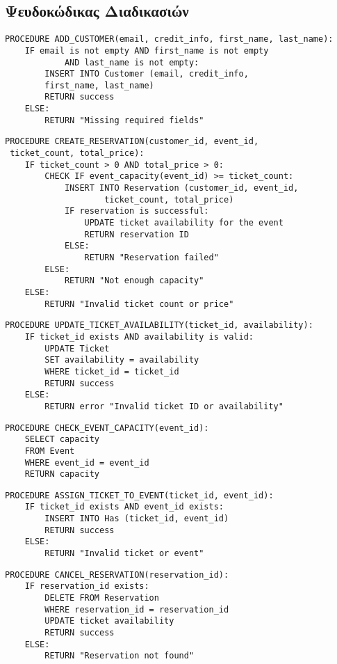\documentclass[a4paper, 11pt]{article}
\begin{document}
\subsection*{Ψευδοκώδικας Διαδικασιών}
\begin{verbatim}
PROCEDURE ADD_CUSTOMER(email, credit_info, first_name, last_name):
    IF email is not empty AND first_name is not empty 
    		AND last_name is not empty:
        INSERT INTO Customer (email, credit_info, 
        first_name, last_name)
        RETURN success
    ELSE:
        RETURN "Missing required fields"
\end{verbatim}
\begin{verbatim}
PROCEDURE CREATE_RESERVATION(customer_id, event_id,
 ticket_count, total_price):
    IF ticket_count > 0 AND total_price > 0:
        CHECK IF event_capacity(event_id) >= ticket_count:
            INSERT INTO Reservation (customer_id, event_id, 
            		ticket_count, total_price)
            IF reservation is successful:
                UPDATE ticket availability for the event
                RETURN reservation ID
            ELSE:
                RETURN "Reservation failed"
        ELSE:
            RETURN "Not enough capacity"
    ELSE:
        RETURN "Invalid ticket count or price"
\end{verbatim}
\begin{verbatim}
PROCEDURE UPDATE_TICKET_AVAILABILITY(ticket_id, availability):
    IF ticket_id exists AND availability is valid:
        UPDATE Ticket 
        SET availability = availability 
        WHERE ticket_id = ticket_id
        RETURN success
    ELSE:
        RETURN error "Invalid ticket ID or availability"
\end{verbatim}
\begin{verbatim}
PROCEDURE CHECK_EVENT_CAPACITY(event_id):
    SELECT capacity 
    FROM Event 
    WHERE event_id = event_id
    RETURN capacity
\end{verbatim} 
\begin{verbatim}
PROCEDURE ASSIGN_TICKET_TO_EVENT(ticket_id, event_id):
    IF ticket_id exists AND event_id exists:
        INSERT INTO Has (ticket_id, event_id)
        RETURN success
    ELSE:
        RETURN "Invalid ticket or event"
\end{verbatim}
\begin{verbatim}
PROCEDURE CANCEL_RESERVATION(reservation_id):
    IF reservation_id exists:
        DELETE FROM Reservation 
        WHERE reservation_id = reservation_id
        UPDATE ticket availability
        RETURN success
    ELSE:
        RETURN "Reservation not found"
\end{verbatim}
\end{document}
